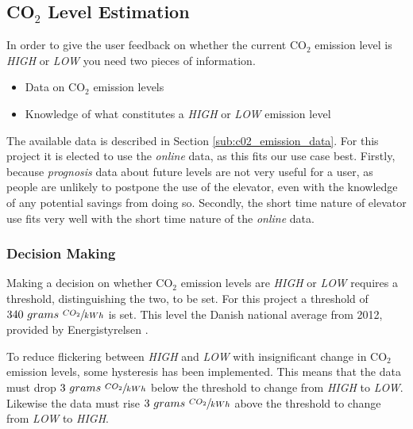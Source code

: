 \documentclass[Main]{subfiles}
\begin{document}
\subsection{CO$_2$ Level Estimation} %
\label{sub:co__2_level_estimation}

	In order to give the user feedback on whether the current CO$_2$ emission level is \emph{HIGH} or \emph{LOW} you need two pieces of information.

	\begin{itemize}
		\item Data on CO$_2$ emission levels
		\item Knowledge of what constitutes a \emph{HIGH} or \emph{LOW} emission level
	\end{itemize}

	The available data is described in Section \ref{sub:c02_emission_data}.
	For this project it is elected to use the \emph{online} data, as this fits our use case best.
	Firstly, because \emph{prognosis} data about future levels are not very useful for a user, as people are unlikely to postpone the use of the elevator, even with the knowledge of any potential savings from doing so.
	Secondly, the short time nature of elevator use fits very well with the short time nature of the \emph{online} data.
 

	\subsubsection{Decision Making} %
	\label{sub:decision_making}

		Making a decision on whether CO$_2$ emission levels are \emph{HIGH} or \emph{LOW} requires a threshold, distinguishing the two, to be set.
		For this project a threshold of $340\ grams\ \sfrac{CO_2}{kWh}$ is set.
		This level the Danish national average from 2012, provided by Energistyrelsen \cite{Energistyrelsen:2012:Online}.

		To reduce flickering between \emph{HIGH} and \emph{LOW} with insignificant change in CO$_2$ emission levels, some hysteresis has been implemented.
		This means that the data must drop $3\ grams\ \sfrac{CO_2}{kWh}$ below the threshold to change from \emph{HIGH} to \emph{LOW}.
		Likewise the data must rise $3\ grams\ \sfrac{CO_2}{kWh}$ above the threshold to change from \emph{LOW} to \emph{HIGH}.
	
\end{document}
